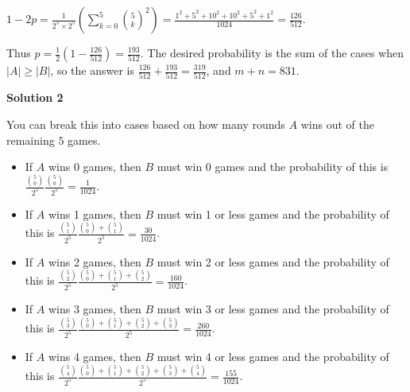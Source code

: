 \begin{enumerate}
 $1-2p = \frac{1}{2^{5} \times 2^{5}}\left(\sum_{k=0}^{5} {5\choose k}^2\right) = \frac{1^2+5^2+10^2+10^2+5^2+1^2}{1024} = \frac{126}{512}.$

 Thus $p = \frac 12 \left(1-\frac{126}{512}\right) = \frac{193}{512}$. The desired probability is the sum of the cases when $|A| \ge |B|$, so the answer is $\frac{126}{512} + \frac{193}{512} = \frac{319}{512}$, and $m+n = \boxed{831}$.

 



\textbf{Solution 2}

You can break this into cases based on how many rounds $A$ wins out of the remaining $5$ games.

 
            \begin{itemize}
        \item If $A$ wins 0 games, then $B$ must win 0 games and the probability of this is $\frac{{5 \choose 0}}{2^5} \frac{{5 \choose 0}}{2^5} = \frac{1}{1024}$.
            \end{itemize}
            
            \begin{itemize}
        \item If $A$ wins 1 games, then $B$ must win 1 or less games and the probability of this is $\frac{{5 \choose 1}}{2^5} \frac{{5 \choose 0}+{5 \choose 1}}{2^5} = \frac{30}{1024}$.
            \end{itemize}
            
            \begin{itemize}
        \item If $A$ wins 2 games, then $B$ must win 2 or less games and the probability of this is $\frac{{5 \choose 2}}{2^5} \frac{{5 \choose 0}+{5 \choose 1}+{5 \choose 2}}{2^5} = \frac{160}{1024}$.
            \end{itemize}
            
            \begin{itemize}
        \item If $A$ wins 3 games, then $B$ must win 3 or less games and the probability of this is $\frac{{5 \choose 3}}{2^5} \frac{{5 \choose 0}+{5 \choose 1}+{5 \choose 2}+{5 \choose 3}}{2^5} = \frac{260}{1024}$.
            \end{itemize}
            
            \begin{itemize}
        \item If $A$ wins 4 games, then $B$ must win 4 or less games and the probability of this is $\frac{{5 \choose 4}}{2^5} \frac{{5 \choose 0}+{5 \choose 1}+{5 \choose 2}+{5 \choose 3}+{5 \choose 4}}{2^5} = \frac{155}{1024}$.
            \end{itemize}
            

\end{enumerate}
